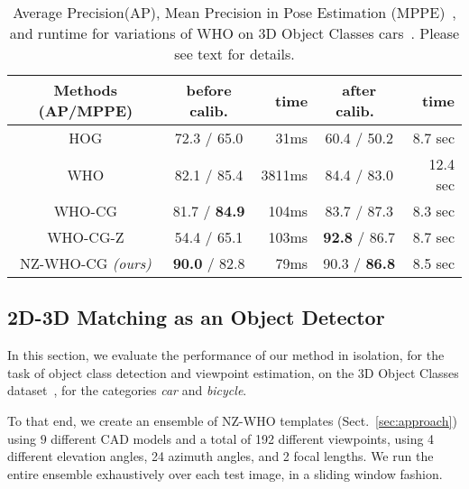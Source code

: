 \begin{table}[!htbp]
  \footnotesize
  \setlength{\tabcolsep}{1pt}
  \centering
  \begin{tabular}{|c|c|r|c|r|}
    \hline
    Methods (AP/MPPE) & before calib.  & time & after calib.~\cite{Aubry14} & time \\
    \hline\hline
    HOG\cite{Dalal05}     & 72.3 / 65.0           &  31ms  & 60.4 / 50.2                 & 8.7 sec \\ 
    WHO\cite{Hariharan12} & 82.1 / 85.4           &  3811ms& 84.4 / 83.0                 & 12.4 sec  \\
    WHO-CG                & 81.7 / \textbf{84.9}  &  104ms & 83.7 / 87.3                 & 8.3 sec \\
    WHO-CG-Z              & 54.4 / 65.1           &  103ms & \textbf{92.8} / 86.7        & 8.7 sec  \\
    NZ-WHO-CG {\em (ours)}  & \textbf{90.0} / 82.8  &   79ms & 90.3 / \textbf{86.8}        & 8.5 sec   \\
    \hline
  \end{tabular}
  \caption{Average Precision(AP), Mean Precision in Pose Estimation
    (MPPE)~\cite{Lopez-Sastre11}, and runtime for variations of WHO on
    3D Object Classes cars~\cite{Savarese07}. Please see text for
    details.}
  \label{tab:who_initializations}
\end{table}


\subsection{2D-3D Matching as an Object Detector} 
\label{sec:exp_iso}
In this section, we evaluate the performance of our method in
isolation, for the task of object class detection and viewpoint
estimation, on the 3D Object Classes dataset~\cite{Savarese07}, for the
categories {\em car} and {\em bicycle}.

To that end, we create an ensemble of NZ-WHO templates (Sect.~\ref{sec:approach})
using $9$ different CAD models and a total of 192 different
viewpoints, using 4 different elevation angles, 24 azimuth angles,
and 2 focal lengths. We run the entire ensemble exhaustively over
each test image, in a sliding window fashion.

